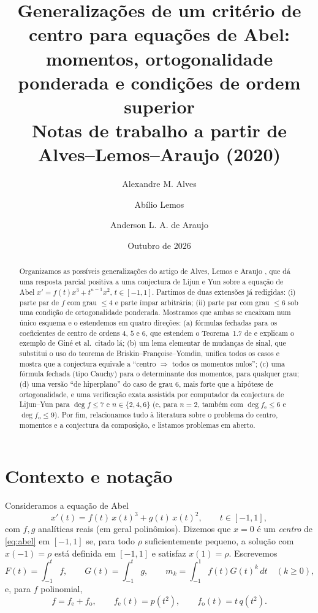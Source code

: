 \documentclass[11pt]{article}
\title{Generalizações de um critério de centro para equações de Abel:\\
momentos, ortogonalidade ponderada e condições de ordem superior\\[2mm]
\large Notas de trabalho a partir de Alves--Lemos--Araujo (2020)}
\author{Alexandre M. Alves \and Ab\'ilio Lemos \and Anderson L. A. de Araujo}
\date{Outubro de 2026}
\theoremstyle{plain}
\theoremstyle{definition}
\theoremstyle{remark}
\newcommand{\fe}{f_{\mathrm e}}
\newcommand{\fo}{f_{\mathrm o}}
\begin{document}
\maketitle

\begin{abstract}
Organizamos as possíveis generalizações do artigo de Alves, Lemos e Araujo
\cite{ALA20}, que dá uma resposta parcial positiva a uma conjectura de Lijun e
Yun \cite{LY01} sobre a equação de Abel
$x'=f(t)x^3+t^{n-1}x^2$, $t\in[-1,1]$. Partimos de duas extensões já
redigidas: (i) parte par de $f$ com grau $\le 4$ e parte ímpar arbitrária;
(ii) parte par com grau $\le 6$ sob uma condição de ortogonalidade ponderada.
Mostramos que ambas se encaixam num único esquema e o estendemos em quatro
direções:
(a) fórmulas fechadas para os coeficientes de centro de ordens $4$, $5$ e $6$,
que estendem o Teorema~1.7 de \cite{ALA20} e explicam o exemplo de Giné et
al.\ citado lá;
(b) um lema elementar de mudanças de sinal, que substitui o uso do teorema de
Briskin--Françoise--Yomdin, unifica todos os casos e mostra que a
conjectura equivale a ``centro $\Rightarrow$ todos os momentos nulos'';
(c) uma fórmula fechada (tipo Cauchy) para o determinante dos momentos, para
qualquer grau;
(d) uma versão ``de hiperplano'' do caso de grau $6$, mais forte que a hipótese
de ortogonalidade, e uma verificação exata assistida por computador da
conjectura de Lijun--Yun para $\deg f\le 7$ e $n\in\{2,4,6\}$
(e, para $n=2$, também com $\deg\fe\le6$ e $\deg\fo\le9$).
Por fim, relacionamos tudo à literatura sobre o problema do centro, momentos e
a conjectura da composição, e listamos problemas em aberto.
\end{abstract}

\tableofcontents

\section{Contexto e notação}

Consideramos a equação de Abel
\begin{equation}\label{eq:abel}
 x'(t)=f(t)\,x(t)^3+g(t)\,x(t)^2,\qquad t\in[-1,1],
\end{equation}
com $f,g$ analíticas reais (em geral polinômios). Dizemos que $x=0$ é um
\emph{centro} de \eqref{eq:abel} em $[-1,1]$ se, para todo $\rho$ suficientemente
pequeno, a solução com $x(-1)=\rho$ está definida em $[-1,1]$ e satisfaz
$x(1)=\rho$. Escrevemos
\[
 F(t)=\int_{-1}^t f,\qquad G(t)=\int_{-1}^t g,\qquad
 m_k=\int_{-1}^1 f(t)G(t)^k\,dt\quad(k\ge 0),
\]
e, para $f$ polinomial,
\[
 f=\fe+\fo,\qquad \fe(t)=p(t^2),\qquad \fo(t)=t\,q(t^2).
\]
\end{document}
